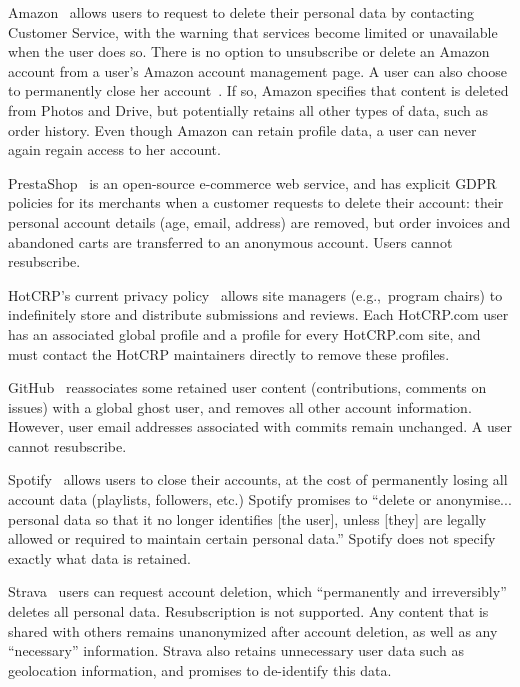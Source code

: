 Amazon~\cite{amazon:privacy} allows users to request to delete their personal data by contacting
Customer Service, with the warning that services become limited or unavailable when the user does
so. There is no option to unsubscribe or delete an Amazon account from a user's Amazon account
management page.  A user can also choose to permanently close her account~\cite{amazon:close}. If
so, Amazon specifies that content is deleted from Photos and Drive, but potentially retains all other types
of data, such as order history. Even though Amazon can retain profile data, a user can never
again regain access to her account.

PrestaShop~\cite{prestashop:privacy} is an open-source e-commerce web service, and has explicit GDPR
policies for its merchants when a customer requests to delete their account: their personal account
details (age, email, address) are removed, but order invoices and abandoned carts are transferred to
an anonymous account. Users cannot resubscribe.

HotCRP's current privacy policy~\cite{hotcrp:privacy} allows site managers (e.g.,\ program chairs)
to indefinitely store and distribute submissions and reviews. Each HotCRP.com user has an associated
global profile and a profile for every HotCRP.com site, and must contact the HotCRP maintainers
directly to remove these profiles.

GitHub~\cite{github:privacy} reassociates some retained user content (contributions, comments on
issues) with a global ghost user, and removes all other account information. However, user email
addresses associated with commits remain unchanged. A user cannot resubscribe.

Spotify~\cite{spotify:privacy} allows users to close their accounts, at the cost of permanently
losing all account data (playlists, followers, etc.) Spotify promises to ``delete or anonymise...
personal data so that it no longer identifies [the user], unless [they] are legally allowed or
required to maintain certain personal data.'' Spotify does not specify exactly what data is
retained.

Strava~\cite{strava:privacy} users can request account deletion, which ``permanently and
irreversibly'' deletes all personal data. Resubscription is not supported. Any content that is
shared with others remains unanonymized after account deletion, as well as any ``necessary''
information. Strava also retains unnecessary user data such as geolocation information, and promises
to de-identify this data.


